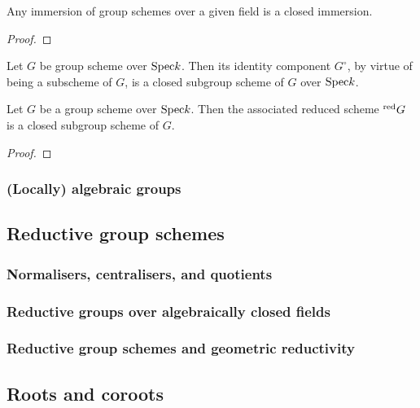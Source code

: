            \begin{proposition} \label{prop: subgroup_schemes_are_closed_over_fields}
                Any immersion of group schemes over a given field is a closed immersion.
            \end{proposition}
                \begin{proof}
                    
                \end{proof}
            \begin{corollary}
                Let $G$ be group scheme over $\mathrm{Spec} k$. Then its identity component $G^{\circ}$, by virtue of being a subscheme of $G$, is a closed subgroup scheme of $G$ over $\mathrm{Spec} k$.
            \end{corollary}
            
            \begin{proposition} \label{prop: associated_reduced_group_scheme}
                Let $G$ be a group scheme over $\mathrm{Spec} k$. Then the associated reduced scheme ${}^{\mathrm{red}}G$ is a closed subgroup scheme of $G$.
            \end{proposition}
                \begin{proof}
                    
                \end{proof}
                
        \subsubsection{(Locally) algebraic groups}
                
    \subsection{Reductive group schemes}
        \subsubsection{Normalisers, centralisers, and quotients}
        
        \subsubsection{Reductive groups over algebraically closed fields}
        
        \subsubsection{Reductive group schemes and geometric reductivity}
    
    \subsection{Roots and coroots}